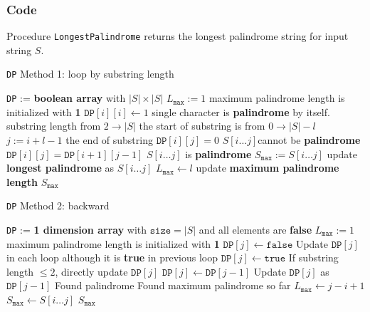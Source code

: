 \subsubsection{Code}
Procedure \texttt{LongestPalindrome} returns the longest palindrome string for input string $S$.
\setcounter{algorithm}{0}
\begin{algorithm}[H]
\caption{\texttt{DP} Method 1: loop by substring length}
\begin{algorithmic}[1]
\State \texttt{DP} := \textbf{boolean array} with $|S|\times|S|$
\State $L_\mathtt{max} := 1$ \Comment maximum palindrome length is initialized with \textbf{1} 
\State $\mathtt{DP}[i][i] \gets 1$ \Comment single character is \textbf{palindrome} by itself.
\EndFor
{} \Comment substring length from $2 \to |S|$
 \Comment the start of substring is from $0 \to |S| - l$
\State $j := i + l - 1$ \Comment the end of substring
\State $\mathtt{DP}[i][j] = 0$ \Comment $S[i\ldots j] $cannot be \textbf{palindrome}
\Else
\State $\mathtt{DP}[i][j] = \mathtt{DP}[i+1][j-1]$ 
\EndIf
{} \Comment $S[i\ldots j]$ is \textbf{palindrome}
\State $S_\mathtt{max} := S[i\ldots j]$ \Comment update \textbf{longest palindrome} as $S[i\ldots j]$
\State $L_\mathtt{max} \gets l$ \Comment update \textbf{maximum palindrome length}
\EndIf
\EndIf
\EndFor
\EndFor
\State \Return $S_\mathtt{max}$
\EndProcedure
\end{algorithmic}
\end{algorithm}

\begin{algorithm}[H]
\caption{\texttt{DP} Method 2: backward}
\begin{algorithmic}[1]
\State \texttt{DP} := \textbf{1 dimension array} with $\mathtt{size} = |S|$ and all elements are \textbf{false}
\State $L_\mathtt{max} := 1$ \Comment maximum palindrome length is initialized with \textbf{1} 
\State $\mathtt{DP}[j] \gets \mathtt{false}$ \Comment Update $\mathtt{DP}[j]$ in each loop although it is \textbf{true} in previous loop
\Else
{}
\State $\mathtt{DP}[j] \gets \mathtt{true}$ \Comment If substring length $\leq 2$, directly update $\mathtt{DP}[j]$
\Else 
\State $\mathtt{DP}[j] \gets \mathtt{DP}[j-1]$ \Comment  Update $\mathtt{DP}[j]$ as $\mathtt{DP}[j-1]$ 
\EndIf
\EndIf
{} \Comment Found palindrome
 \Comment Found maximum palindrome so far
\State $L_\mathtt{max} \gets j-i +1$
\State $S_\mathtt{max} \gets S[i\ldots j]$
\EndIf
\EndIf
\EndFor
\EndFor
\State \Return $S_\mathtt{max}$
\EndProcedure
\end{algorithmic}
\end{algorithm}



